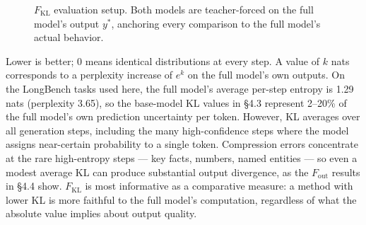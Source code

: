 \documentclass[10pt,letterpaper]{article}
\begin{document}
\begin{figure}[H]
\centering
{}
\caption{$F_{\text{KL}}$ evaluation setup. Both models are teacher-forced on the full model's
output $y^*$, anchoring every comparison to the full model's actual behavior.}
\label{fig:eval-setup}
\end{figure}

Lower is better; 0 means identical distributions at every step.
A value of $k$ nats corresponds to a perplexity increase of $e^k$
on the full model's own outputs. On the LongBench tasks used here,
the full model's average per-step entropy is 1.29 nats (perplexity
3.65), so the base-model KL values in \S4.3 represent 2--20\%
of the full model's own prediction uncertainty per token.
However, KL averages over all generation steps, including the many
high-confidence steps where the model assigns near-certain probability
to a single token. Compression errors concentrate at the rare
high-entropy steps --- key facts, numbers, named entities --- so even
a modest average KL can produce substantial output divergence, as the
$F_{\text{out}}$ results in \S4.4 show. $F_{\text{KL}}$ is most
informative as a comparative measure: a method with lower KL is
more faithful to the full model's computation, regardless of what
the absolute value implies about output quality.
\end{document}
